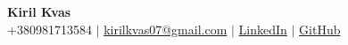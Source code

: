 \documentclass[letterpaper,11pt]{article}
\begin{document}
\begin{center}
    \textbf{\Huge Kiril Kvas} \\ \vspace{1pt}
    \small +380981713584 $|$ \href{mailto:kirilkvas07@gmail.com}{kirilkvas07@gmail.com} $|$
    \href{https://www.linkedin.com/in/kiril-kvas-999154239/}{LinkedIn} $|$
    \href{https://github.com/rillsvai}{GitHub}
\end{center}
\end{document}
